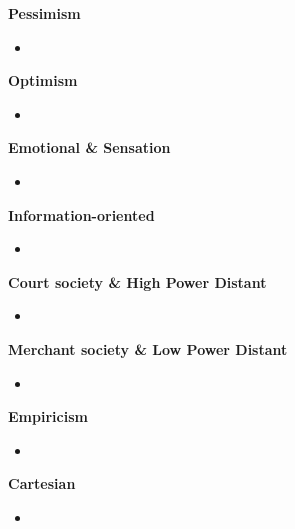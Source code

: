 \documentclass[11pt,a4paper,oneside,french,svgnames]{report}
\begin{document}
\begin{center}
\begin{minipage}[t]{.45\textwidth}
\centering\textbf{Pessimism}\\
  \begin{itemize}
    \item
  \end{itemize}
\end{minipage}
\begin{minipage}[t]{.45\textwidth}
\centering\textbf{Optimism}\\
  \begin{itemize}
    \item
  \end{itemize}
\end{minipage}

\begin{minipage}[t]{.45\textwidth}
\centering\textbf{Emotional \& Sensation}\\
  \begin{itemize}
    \item
  \end{itemize}
\end{minipage}
\begin{minipage}[t]{.45\textwidth}
\centering\textbf{Information-oriented}\\
  \begin{itemize}
    \item
  \end{itemize}
\end{minipage}

\begin{minipage}[t]{.45\textwidth}
\centering\textbf{Court society \& High Power Distant}\\
  \begin{itemize}
    \item
  \end{itemize}
\end{minipage}
\begin{minipage}[t]{.45\textwidth}
\centering\textbf{Merchant society \& Low Power Distant}\\
  \begin{itemize}
    \item
  \end{itemize}
\end{minipage}

\begin{minipage}[t]{.45\textwidth}
\centering\textbf{Empiricism}\\
  \begin{itemize}
    \item
  \end{itemize}
\end{minipage}
\begin{minipage}[t]{.45\textwidth}
\centering\textbf{Cartesian}\\
  \begin{itemize}
    \item
  \end{itemize}
\end{minipage}

\end{center}
\end{document}
